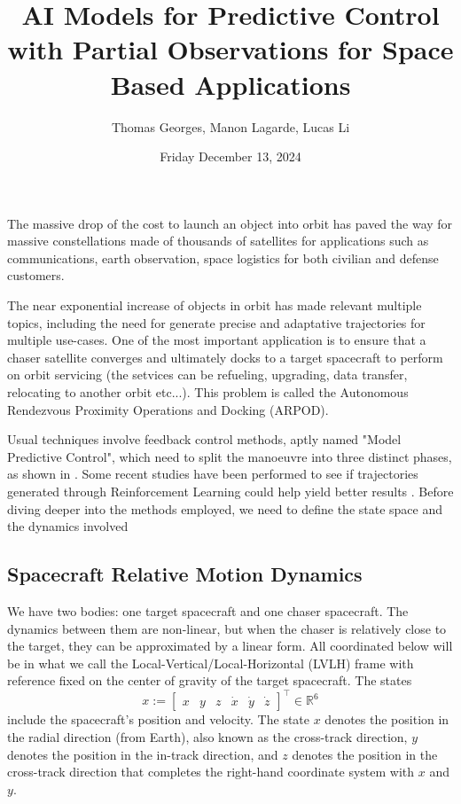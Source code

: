 \documentclass[12pt]{article}
\title{\textbf{AI Models for Predictive Control with Partial Observations  for Space Based Applications}}
\author{\Large{Thomas Georges, Manon Lagarde, Lucas Li}}
\date{ Friday December 13, 2024}
\begin{document}
\maketitle 

The massive drop of the cost to launch an object into orbit has paved the way for massive constellations made of thousands of satellites for applications such as communications, earth observation, space logistics for both civilian and defense customers. 

The near exponential increase of objects in orbit has made relevant multiple topics, including the need for generate precise and adaptative trajectories for multiple use-cases.
One of the most important application is to ensure that a chaser satellite converges and ultimately docks to a target spacecraft to perform on orbit servicing (the setvices can be refueling, upgrading, data transfer, relocating to another orbit etc...). This problem is called the Autonomous Rendezvous Proximity Operations and Docking (ARPOD).

Usual techniques involve feedback control methods, aptly named "Model Predictive Control", which need to split the manoeuvre into three distinct phases, as shown in \cite{Chen}. Some recent studies have been performed to see if trajectories generated through Reinforcement Learning could help yield better results \cite{Lavagna}. Before diving deeper into the methods employed, we need to define the state space and the dynamics involved



\subsection*{Spacecraft Relative Motion Dynamics}

We have two bodies: one target spacecraft and one chaser spacecraft. The dynamics between them are non-linear, but when the chaser is relatively close to the target, they can be approximated by a linear form. All coordinated below will be in what we call
the Local-Vertical/Local-Horizontal (LVLH) frame with reference fixed on the
center of gravity of the target spacecraft. The states 
\[
x := \begin{bmatrix} x & y & z & \dot{x} & \dot{y} & \dot{z} \end{bmatrix}^\top \in \mathbb{R}^6
\]
include the spacecraft’s position and velocity. The state $x$ denotes the position in the radial direction (from Earth), also known as the cross-track direction, $y$ denotes the position in the in-track direction, and $z$ denotes the position in the cross-track direction that completes the right-hand coordinate system with $x$ and $y$.
\end{document}
